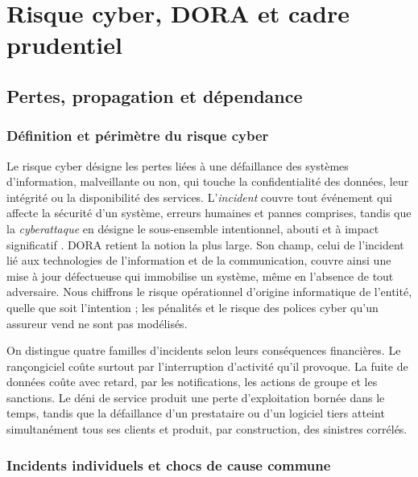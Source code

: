 \chapter{Risque cyber, DORA et cadre prudentiel}
\label{chap:cadre-cyber-dora}
\label{part:contexte}



\section{Pertes, propagation et dépendance}
\label{sec:risque-cyber}

\subsection{Définition et périmètre du risque cyber}
\label{subsec:definition-cyber}

Le risque cyber désigne les pertes liées à une défaillance des systèmes d'information, malveillante
ou non, qui touche la confidentialité des données, leur intégrité ou la disponibilité des services.
L'\emph{incident} couvre tout événement qui affecte la sécurité d'un système, erreurs humaines et
pannes comprises, tandis que la \emph{cyberattaque} en désigne le sous-ensemble intentionnel, abouti
et à impact significatif \citep{cesin2026}. DORA retient la notion la plus large. Son champ, celui
de l'incident lié aux technologies de l'information et de la communication, couvre ainsi une mise à
jour défectueuse qui immobilise un système, même en l'absence de tout adversaire. Nous chiffrons le risque opérationnel d'origine informatique de l'entité, quelle que soit l'intention ; les pénalités et le risque des polices cyber qu'un assureur vend ne sont pas modélisés.

On distingue quatre familles d'incidents selon leurs conséquences financières. Le rançongiciel
coûte surtout par l'interruption d'activité qu'il provoque. La fuite de données coûte avec retard, par les notifications, les actions de groupe et les sanctions. Le déni de service produit
une perte d'exploitation bornée dans le temps, tandis que la défaillance d'un prestataire ou d'un
logiciel tiers atteint simultanément tous ses clients et produit, par construction, des sinistres
corrélés.

\subsection{Incidents individuels et chocs de cause commune}
\label{subsec:chocs-cause-commune}

